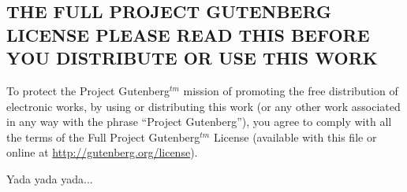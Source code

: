 \subsection*{THE FULL PROJECT GUTENBERG LICENSE PLEASE READ THIS BEFORE YOU DISTRIBUTE OR USE THIS WORK}

To protect the Project Gutenberg$^{tm}$ mission of promoting the free
distribution of electronic works, by using or distributing this work
(or any other work associated in any way with the phrase “Project
Gutenberg”), you agree to comply with all the terms of the Full Project
Gutenberg$^{tm}$ License (available with this file or online at
\url{http://gutenberg.org/license}).

Yada yada yada...

